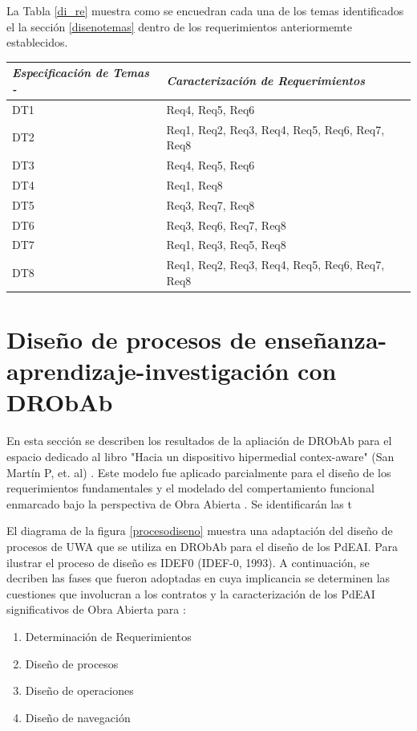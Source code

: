 \documentclass{llncs}
\begin{document}
La Tabla \ref{di_re} muestra como se encuedran cada una de los temas identificados el la sección \ref{disenotemas} dentro de los requerimientos anteriormemte establecidos.	

\begin{center}
\begin{tabular}{l l }
\hline
\textit{\textbf{Especificación de Temas}\textit{}                      -}& \textit{\textbf{Caracterización de Requerimientos}}\\
\hline
DT1  				& Req4, Req5, Req6 \\
DT2				& Req1, Req2, Req3, Req4, Req5, Req6, Req7, Req8 \\
DT3				& Req4, Req5, Req6 \\
DT4				& Req1, Req8 \\
DT5				& Req3, Req7, Req8 \\
DT6				& Req3, Req6, Req7, Req8 \\
DT7				& Req1, Req3, Req5, Req8 \\
DT8				& Req1, Req2, Req3, Req4, Req5, Req6, Req7, Req8 \\
\hline

 \end{tabular}  
\end{center}

\section {Diseño de procesos de enseñanza-aprendizaje-investigación con DRObAb}


En esta sección se describen los resultados de la apliación de DRObAb para el espacio dedicado al libro "Hacia un dispositivo hipermedial contex-aware" (San Martín P, et. al) \cite{libro}.  Este  modelo fue aplicado parcialmente para el diseño de los requerimientos fundamentales y el modelado del compertamiento funcional enmarcado bajo la perspectiva de Obra Abierta \cite{ObraAbierta}. Se identificarán las t




El diagrama de la figura \ref{procesodiseno} muestra una adaptación del diseño de procesos de UWA \cite{UWA} que se utiliza en DRObAb para el diseño de los PdEAI. Para ilustrar el proceso de diseño es IDEF0 (IDEF-0, 1993). A continuación, se decriben las fases que fueron adoptadas en cuya implicancia se determinen las cuestiones que involucran a los contratos y la caracterización de los PdEAI significativos de Obra Abierta para \cite{libro7}:

\begin{enumerate}
 \item Determinación de Requerimientos 
 \item Diseño de procesos
 \item Diseño de operaciones
 \item Diseño de navegación
\end{enumerate}
\end{document}
